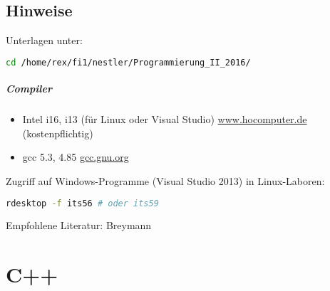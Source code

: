 






\maketitle
\newpage
\tableofcontents
\newpage

\section*{Hinweise}
Unterlagen unter:
\begin{lstlisting}[language=bash]
cd /home/rex/fi1/nestler/Programmierung_II_2016/
\end{lstlisting}
\paragraph{Compiler} 
\begin{itemize}
\item Intel i16, i13 (für Linux oder Visual Studio) \url{www.hocomputer.de} (kostenpflichtig)
\item gcc 5.3, 4.85 \url{gcc.gnu.org}
\end{itemize}
Zugriff auf Windows-Programme (Visual Studio 2013) in Linux-Laboren:
\begin{lstlisting}[language=bash]
rdesktop -f its56 # oder its59
\end{lstlisting}
Empfohlene Literatur: Breymann\cite{breymann2009c++}

\chapter{C++}
